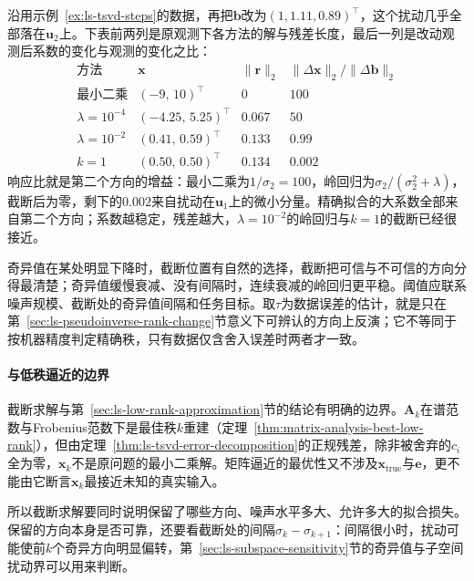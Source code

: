 \begin{example}[岭回归与截断SVD的比较]
\label{ex:ls-regularization-response}
沿用示例~\ref{ex:ls-tsvd-steps}的数据，再把$\bm b$改为$(1,1.11,0.89)^\top$，这个扰动几乎全部落在$\bm u_2$上。下表前两列是原观测下各方法的解与残差长度，最后一列是改动观测后系数的变化与观测的变化之比：
\[
 \begin{array}{lccc}
  \text{方法} & \bm x & \lVert\bm r\rVert_2 & \lVert\Delta\bm x\rVert_2/\lVert\Delta\bm b\rVert_2\\[2pt]
  \text{最小二乘} & (-9,\,10)^\top & 0 & 100\\
  \lambda=10^{-4} & (-4.25,\,5.25)^\top & 0.067 & 50\\
  \lambda=10^{-2} & (0.41,\,0.59)^\top & 0.133 & 0.99\\
  k=1 & (0.50,\,0.50)^\top & 0.134 & 0.002
 \end{array}
\]
响应比就是第二个方向的增益：最小二乘为$1/\sigma_2=100$，岭回归为$\sigma_2/(\sigma_2^2+\lambda)$，截断后为零，剩下的$0.002$来自扰动在$\bm u_1$上的微小分量。精确拟合的大系数全部来自第二个方向；系数越稳定，残差越大，$\lambda=10^{-2}$的岭回归与$k=1$的截断已经很接近。
\end{example}

奇异值在某处明显下降时，截断位置有自然的选择，截断把可信与不可信的方向分得最清楚；奇异值缓慢衰减、没有间隔时，连续衰减的岭回归更平稳。阈值应联系噪声规模、截断处的奇异值间隔和任务目标。取$\tau$为数据误差的估计，就是只在第~\ref{sec:ls-pseudoinverse-rank-change}节意义下可辨认的方向上反演；它不等同于按机器精度判定精确秩，只有数据仅含舍入误差时两者才一致。

\paragraph{与低秩逼近的边界}
截断求解与第~\ref{sec:ls-low-rank-approximation}节的结论有明确的边界。$\bm A_k$在谱范数与Frobenius范数下是最佳秩$k$重建（定理~\ref{thm:matrix-analysis-best-low-rank}），但由定理~\ref{thm:ls-tsvd-error-decomposition}的正规残差，除非被舍弃的$c_i$全为零，$\bm x_k$不是原问题的最小二乘解。矩阵逼近的最优性又不涉及$\bm x_{\mathrm{true}}$与$\bm e$，更不能由它断言$\bm x_k$最接近未知的真实输入。

所以截断求解要同时说明保留了哪些方向、噪声水平多大、允许多大的拟合损失。保留的方向本身是否可靠，还要看截断处的间隔$\sigma_k-\sigma_{k+1}$：间隔很小时，扰动可能使前$k$个奇异方向明显偏转，第~\ref{sec:ls-subspace-sensitivity}节的奇异值与子空间扰动界可以用来判断。
